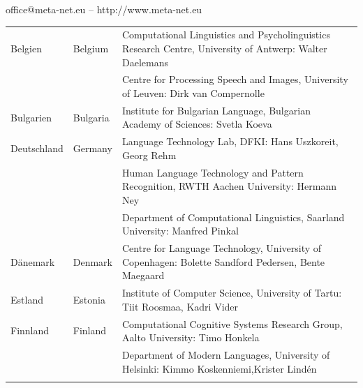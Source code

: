 \documentclass[]{../../metanetpaper}
\begin{document}
\vfill
\centerline{office@meta-net.eu -- http://www.meta-net.eu}

\cleardoublepage

\appendix
{}

%

  
\cleardoublepage

\label{metanetmembers}

\small

\begin{longtable}{@{}llp{113mm}@{}}
  Belgien & \textcolor{grey1}{Belgium} & Computational Linguistics and Psycholinguistics Research Centre, University of Antwerp: Walter Daelemans\\ \addlinespace
  & & Centre for Processing Speech and Images, University of Leuven: Dirk van Compernolle \\ \addlinespace
  Bulgarien & \textcolor{grey1}{Bulgaria} & Institute for Bulgarian Language, Bulgarian Academy of Sciences: Svetla Koeva \\ \addlinespace
  Deutschland & \textcolor{grey1}{Germany} & Language Technology Lab, DFKI: Hans Uszkoreit, Georg Rehm\\ \addlinespace
  & & Human Language Technology and Pattern Recognition, RWTH Aachen University: Hermann Ney \\ \addlinespace
  & & Department of Computational Linguistics, Saarland University: Manfred Pinkal\\ \addlinespace Dänemark &  \textcolor{grey1}{Denmark} & Centre for Language Technology, University of Copenhagen: \newline Bolette Sandford Pedersen, Bente Maegaard\\ \addlinespace
  Estland & \textcolor{grey1}{Estonia} & Institute of Computer Science, University of Tartu: Tiit Roosmaa, Kadri Vider\\ \addlinespace
  Finnland & \textcolor{grey1}{Finland} & Computational Cognitive Systems Research Group, Aalto University: Timo Honkela\\ \addlinespace
  & & Department of Modern Languages, University of Helsinki: Kimmo Koskenniemi,\newline Krister Lindén \\ \addlinespace

\end{longtable}
\end{document}

